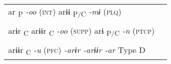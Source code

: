 \begin{table}
\begin{tabular}{ll}
    ar\textsubscript{ P}  \textit{-oo} (\textsc{int})      arɨɨ\textsubscript{ P/C}    \textit{-mɨ} (\textsc{plq})                                                                                                                                                                                                                                                                                                                                                                                                              \\
                                                                                                                                                                                                                                                                                                                                                                                                                                                                                                                                \\
arɨr\textsubscript{ C}  arɨɨr\textsubscript{ C}    \textit{-oo} (\textsc{supp})    arɨ\textsubscript{ P/C}      \textit{-n} (\textsc{ptcp})                                                                                                                                                                                                                                                                                                                                                                                     \\
                                                                                                                                                                                                                                                                                                                                                                                                                                                                                                                                \\
  arɨɨr\textsubscript{ C}    \textit{-u} (\textsc{pfc})    \textit{-arɨr  -arɨɨr  -ar} Type D                                                                                                                                                                                                                                                                                                                                                                                                                                   \\

\end{tabular}
\end{table}
